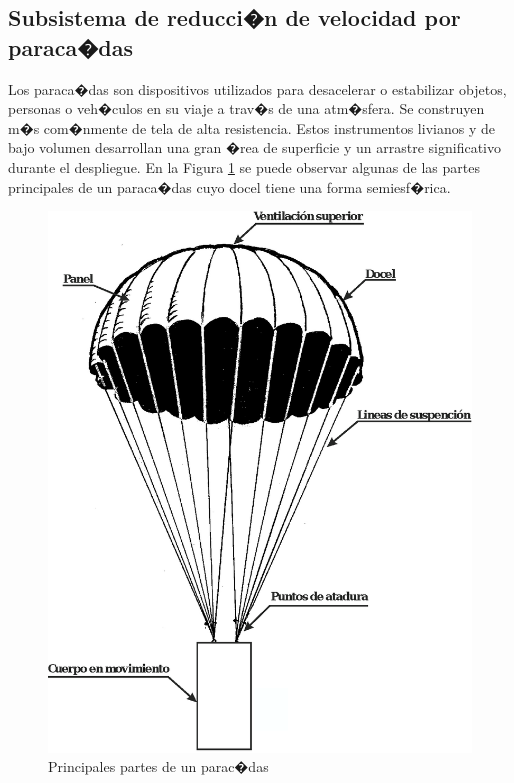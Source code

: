 \documentclass[10pt,a4paper]{book}
\begin{document}
\subsection*{Subsistema de reducci�n de velocidad por paraca�das}
Los paraca�das son dispositivos utilizados para desacelerar o estabilizar objetos, personas o veh�culos en su viaje a trav�s de una atm�sfera. Se construyen m�s com�nmente de tela de alta resistencia. Estos instrumentos livianos y de bajo volumen desarrollan una gran �rea de superficie y un arrastre significativo durante el despliegue. En la Figura \ref{img:PartesParacaidas} se puede observar algunas de las partes principales de un paraca�das cuyo docel tiene una forma semiesf�rica. 
\begin{figure}[H]
\begin{center}
\includegraphics[scale=0.30]{Imagenes/PartesParacaidas.eps}  
\caption{Principales partes de un parac�das\label{img:PartesParacaidas}}
\end{center}
\end{figure}
\end{document}
